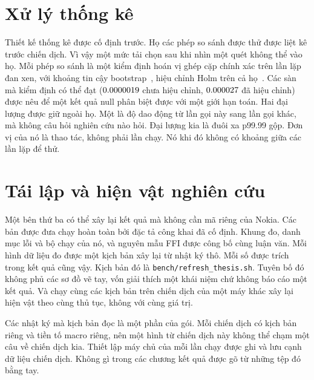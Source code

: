 \section{Xử lý thống kê}\label{sec:statsbrief}
Thiết kế thống kê được cố định trước. Họ các phép so sánh được thử được liệt kê trước chiến
dịch. Vì vậy một mức tải chọn sau khi nhìn một quét không thể vào họ. Mỗi phép so sánh là một
kiểm định hoán vị ghép cặp chính xác trên \NRepeats{} lần lặp đan xen, với khoảng tin cậy
bootstrap~\cite{efron1993bootstrap}, hiệu chỉnh Holm trên cả
họ~\cite{holm1979simple}. Các sàn mà kiểm định có thể đạt ($0.0000019$ chưa hiệu chỉnh,
$0.000027$ đã hiệu chỉnh) được nêu để một kết quả null phân biệt được với một giới hạn
toán. Hai đại lượng được giữ ngoài họ. Một là độ dao động từ lần gọi này sang lần gọi khác, mà
không câu hỏi nghiên cứu nào hỏi. Đại lượng kia là đuôi xa p99.99 gộp. Đơn vị của nó là thao
tác, không phải lần chạy. Nó khi đó không có khoảng giữa các lần lặp để thử.

\section{Tái lập và hiện vật nghiên cứu}\label{sec:repro}
Một bên thứ ba có thể xây lại kết quả mà không cần mã riêng của Nokia. Các bản được đưa chạy
hoàn toàn bởi đặc tả công khai đã cố định. Khung đo, danh mục lỗi và bộ chạy của nó, và nguyên
mẫu FFI được công bố cùng luận văn. Mỗi hình dữ liệu đo được một kịch bản xây lại từ nhật ký
thô. Mỗi số được trích trong kết quả cũng vậy. Kịch bản đó là
\texttt{bench/refresh\_thesis.sh}. Tuyên bố đó không phủ các sơ đồ vẽ tay, vốn giải thích một
khái niệm chứ không báo cáo một kết quả. Và chạy cùng các kịch bản trên chiến dịch của một máy
khác xây lại hiện vật theo cùng thủ tục, không với cùng giá trị.

Các nhật ký mà kịch bản đọc là một phần của gói. Mỗi chiến dịch có kịch bản riêng và tiền tố
macro riêng, nên một hình từ chiến dịch này không thể chạm một câu về chiến dịch kia. Thiết lập
máy chủ của mỗi lần chạy được ghi và lưu cạnh dữ liệu chiến dịch. Không gì trong các chương kết
quả được gõ từ những tệp đó bằng tay.
